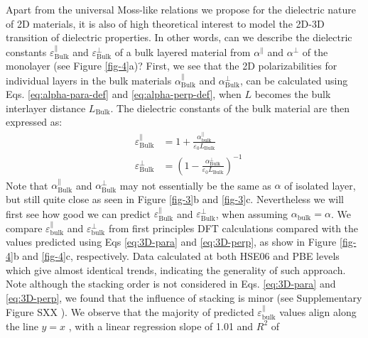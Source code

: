 \documentclass[journal=ancac3,manuscript=article,email=true,hyperref=true,keywords=false]{achemso}
\begin{document}
Apart from the universal Moss-like relations we propose for the
dielectric nature of 2D materials, it is also of high theoretical
interest to model the 2D-3D transition of dielectric properties. In
other words, can we describe the dielectric constants
$\varepsilon^{\parallel}_{\mathrm{Bulk}}$ and
$\varepsilon^{\perp}_{\mathrm{Bulk}}$ of a bulk layered material from
$\alpha^{\parallel}$ and $\alpha^{\perp}$ of the monolayer (see Figure
\ref{fig-4}a)? First, we see that the 2D polarizabilities for
individual layers in the bulk materials
$\alpha_{\mathrm{Bulk}}^{\parallel}$ and
$\alpha_{\mathrm{Bulk}}^{\perp}$, can be calculated using
Eqs. \ref{eq:alpha-para-def} and \ref{eq:alpha-perp-def}, when $L$
becomes the bulk interlayer distance $L_{\mathrm{Bulk}}$. The
dielectric constants of the bulk material are then expressed as:
\begin{subequations}
\begin{eqnarray}
  \label{eq:3D-para}
  &\varepsilon^{\parallel}_{\mathrm{Bulk}} &= 1 + {\displaystyle \frac{\alpha_{\mathrm{bulk}}^{\parallel}}{\varepsilon_{0} L_{\mathrm{Bulk}}}}\\
  \label{eq:3D-perp}
  &\varepsilon^{\perp}_{\mathrm{Bulk}} &= \left(1 - \frac{\alpha_{\mathrm{Bulk}}^{\perp}}{\varepsilon_{0} L_{\mathrm{Bulk}}}\right)^{-1}
\end{eqnarray}
\end{subequations}
Note that $\alpha_{\mathrm{Bulk}}^{\parallel}$ and
$\alpha_{\mathrm{Bulk}}^{\perp}$ may not essentially be the same as
$\alpha$ of isolated layer, but still quite close as seen in Figure
\ref{fig-3}b and \ref{fig-3}c. Nevertheless we will first see how good
we can predict $\varepsilon_{\mathrm{Bulk}}^{\parallel}$ and
$\varepsilon_{\mathrm{Bulk}}^{\perp}$, when assuming
$\alpha_{\mathrm{bulk}}=\alpha$. We compare
$\varepsilon_{\mathrm{bulk}}^{\parallel}$ and
$\varepsilon_{\mathrm{bulk}}^{\perp}$ from first principles DFT
calculations compared with the values predicted using Eqs
\ref{eq:3D-para} and \ref{eq:3D-perp}, as show in Figure \ref{fig-4}b
and \ref{fig-4}c, respectively. Data calculated at both HSE06 and PBE
levels which give almost identical trends, indicating the generality
of such approach. Note although the stacking order is not considered
in Eqs. \ref{eq:3D-para} and \ref{eq:3D-perp}, we found that the
influence of stacking is minor (see Supplementary Figure SXX
). We observe that the majority of
predicted $\varepsilon_{\mathrm{bulk}}^{\parallel}$ values align along
the line $y=x$ , with a linear regression slope of 1.01 and $R^2$ of
\end{document}
